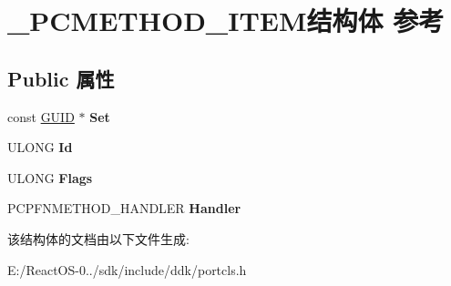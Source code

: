 \hypertarget{struct___p_c_m_e_t_h_o_d___i_t_e_m}{}\section{\+\_\+\+P\+C\+M\+E\+T\+H\+O\+D\+\_\+\+I\+T\+E\+M结构体 参考}
\label{struct___p_c_m_e_t_h_o_d___i_t_e_m}
\subsection*{Public 属性}
\begin{DoxyCompactItemize}
\item 
\mbox{\label{struct___p_c_m_e_t_h_o_d___i_t_e_m_a283283e2bcaeb2ed0f2a95f6bbfb01b7}} 
const \hyperlink{interface_g_u_i_d}{G\+U\+ID} $\ast$ {\bfseries Set}
\item 
\mbox{\label{struct___p_c_m_e_t_h_o_d___i_t_e_m_a8a5289438edbcad1f30218542322663e}} 
U\+L\+O\+NG {\bfseries Id}
\item 
\mbox{\label{struct___p_c_m_e_t_h_o_d___i_t_e_m_a51032f18f191ab3ad24f59f6e2b622c0}} 
U\+L\+O\+NG {\bfseries Flags}
\item 
\mbox{\label{struct___p_c_m_e_t_h_o_d___i_t_e_m_a7b81e0666884b1e9561dcafca8a38a11}} 
P\+C\+P\+F\+N\+M\+E\+T\+H\+O\+D\+\_\+\+H\+A\+N\+D\+L\+ER {\bfseries Handler}
\end{DoxyCompactItemize}


该结构体的文档由以下文件生成\+:\begin{DoxyCompactItemize}
\item 
E\+:/\+React\+O\+S-\/0../sdk/include/ddk/portcls.\+h\end{DoxyCompactItemize}
